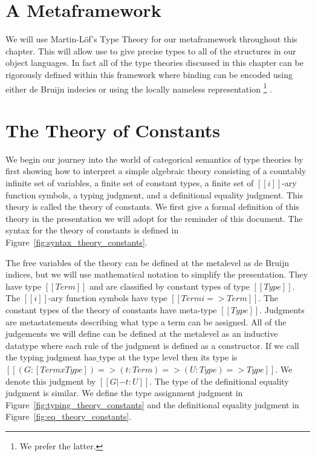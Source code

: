 
\section{A Metaframework}
\label{sec:a_metaframework}
We will use Martin-L\"of's Type Theory for our metaframework throughout this chapter.  
This will allow use to give precise types to all of the structures in our object languages.
In fact all of the type theories discussed in this chapter can be rigorously defined within
this framework where binding can be encoded using either de Bruijn indecies or using the
locally nameless representation \footnote{We prefer the latter.} \cite{??}.


\section{The Theory of Constants}
\label{sec:the_theory_of_constants}
We begin our journey into the world of categorical semantics of type theories by first 
showing how to interpret a simple algebraic theory consisting of a countably infinite set
of variables, a finite set of constant types, a finite set of $[[i]]$-ary function symbols,
a typing judgment, and a definitional equality judgment.  This theory is called the
theory of constants. We first give a formal definition of this theory in the presentation we
will adopt for the reminder of this document.  The syntax for the theory of constants is 
defined in Figure~\ref{fig:syntax_theory_constants}.  

The free variables of the theory can be defined at the metalevel as de
Bruijn indices, but we will use mathematical notation to simplify the
presentation.  They have type $[[Term]]$ and are classified by
constant types of type $[[Type]]$.  The $[[i]]$-ary function symbols
have type $[[Term i => Term]]$.  The constant types of the theory of constants
have meta-type $[[Type]]$.  Judgments are metastatements describing
what type a term can be assigned.  All of the judgements we will
define can be defined at the metalevel as an inductive datatype where
each rule of the judgment is defined as a constructor. If we call the
typing judgment $\text{has}\_\text{type}$ at the type level then its
type is $[[ (G:[Term x Type]) => (t:Term) => (U:Type) => Type]]$.  We
denote this judgment by $[[G |- t : U]]$. The type of the definitional
equality judgment is similar.  We define the type assignment judgment
in Figure~\ref{fig:typing_theory_constants} and the definitional
equality judgment in Figure~\ref{fig:eq_theory_constants}.

